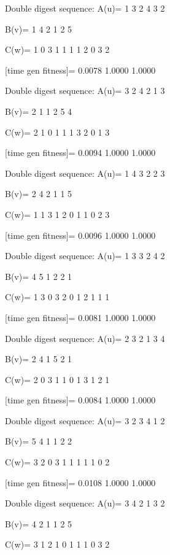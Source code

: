 Double digest sequence:
A(u)=
     1     3     2     4     3     2

B(v)=
     1     4     2     1     2     5

C(w)=
     1     0     3     1     1     1     1     2     0     3     2

[time gen fitness]=
    0.0078    1.0000    1.0000

Double digest sequence:
A(u)=
     3     2     4     2     1     3

B(v)=
     2     1     1     2     5     4

C(w)=
     2     1     0     1     1     1     3     2     0     1     3

[time gen fitness]=
    0.0094    1.0000    1.0000

Double digest sequence:
A(u)=
     1     4     3     2     2     3

B(v)=
     2     4     2     1     1     5

C(w)=
     1     1     3     1     2     0     1     1     0     2     3

[time gen fitness]=
    0.0096    1.0000    1.0000

Double digest sequence:
A(u)=
     1     3     3     2     4     2

B(v)=
     4     5     1     2     2     1

C(w)=
     1     3     0     3     2     0     1     2     1     1     1

[time gen fitness]=
    0.0081    1.0000    1.0000

Double digest sequence:
A(u)=
     2     3     2     1     3     4

B(v)=
     2     4     1     5     2     1

C(w)=
     2     0     3     1     1     0     1     3     1     2     1

[time gen fitness]=
    0.0084    1.0000    1.0000

Double digest sequence:
A(u)=
     3     2     3     4     1     2

B(v)=
     5     4     1     1     2     2

C(w)=
     3     2     0     3     1     1     1     1     1     0     2

[time gen fitness]=
    0.0108    1.0000    1.0000

Double digest sequence:
A(u)=
     3     4     2     1     3     2

B(v)=
     4     2     1     1     2     5

C(w)=
     3     1     2     1     0     1     1     1     0     3     2

